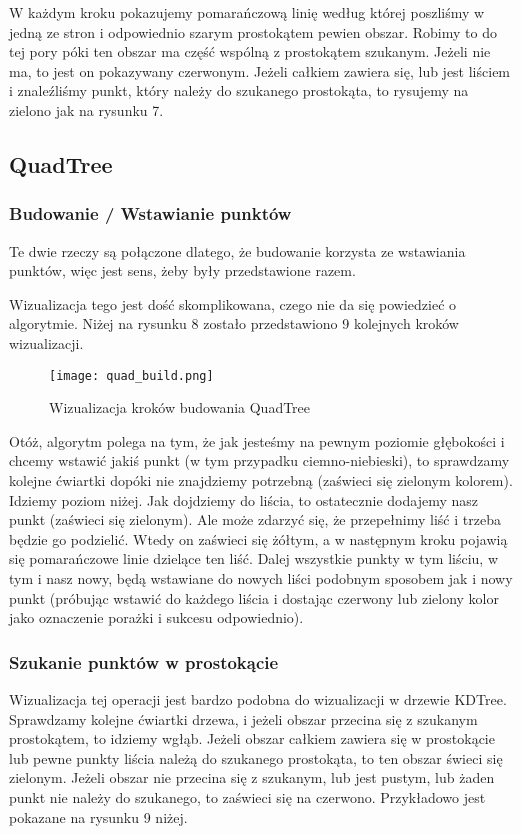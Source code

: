 \documentclass[a4paper, 12pt]{article}
\begin{document}
        \noindent
        \quad W każdym kroku pokazujemy pomarańczową linię według której poszliśmy w jedną ze stron i odpowiednio szarym prostokątem pewien obszar. Robimy to do tej pory póki ten obszar ma część wspólną z prostokątem szukanym. Jeżeli nie ma, to jest on pokazywany czerwonym. Jeżeli całkiem zawiera się, lub jest liściem i znaleźliśmy punkt, który należy do szukanego prostokąta, to rysujemy na zielono jak na rysunku 7.

    \subsection{QuadTree}
      \subsubsection{Budowanie / Wstawianie punktów}
        \quad Te dwie rzeczy są połączone dlatego, że budowanie korzysta ze wstawiania punktów, więc jest sens, żeby były przedstawione razem.

        \noindent
        \quad Wizualizacja tego jest dość skomplikowana, czego nie da się powiedzieć o algorytmie. Niżej na rysunku 8 zostało przedstawiono 9 kolejnych kroków wizualizacji.

        \begin{figure}[h!]
        \centering
          \texttt{[image: quad\_build.png]}
          \caption{Wizualizacja kroków budowania QuadTree}
        \end{figure}

        \noindent
        \quad Otóż, algorytm polega na tym, że jak jesteśmy na pewnym poziomie głębokości i chcemy wstawić jakiś punkt (w tym przypadku ciemno-niebieski), to sprawdzamy kolejne ćwiartki dopóki nie znajdziemy potrzebną (zaświeci się zielonym kolorem). Idziemy poziom niżej. Jak dojdziemy do liścia, to ostatecznie dodajemy nasz punkt (zaświeci się zielonym). Ale może zdarzyć się, że przepełnimy liść i trzeba będzie go podzielić. Wtedy on zaświeci się żółtym, a w następnym kroku pojawią się pomarańczowe linie dzielące ten liść. Dalej wszystkie punkty w tym liściu, w tym i nasz nowy, będą wstawiane do nowych liści podobnym sposobem jak i nowy punkt (próbując wstawić do każdego liścia i dostając czerwony lub zielony kolor jako oznaczenie porażki i sukcesu odpowiednio).

      \subsubsection{Szukanie punktów w prostokącie}
        \quad Wizualizacja tej operacji jest bardzo podobna do wizualizacji w drzewie KDTree. Sprawdzamy kolejne ćwiartki drzewa, i jeżeli obszar przecina się z szukanym prostokątem, to idziemy wgłąb. Jeżeli obszar całkiem zawiera się w prostokącie lub pewne punkty liścia należą do szukanego prostokąta, to ten obszar świeci się zielonym. Jeżeli obszar nie przecina się z szukanym, lub jest pustym, lub żaden punkt nie należy do szukanego, to zaświeci się na czerwono. Przykładowo jest pokazane na rysunku 9 niżej.
\end{document}
